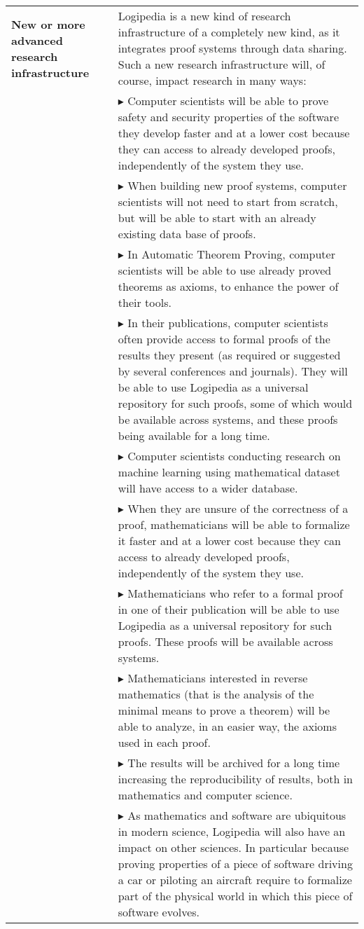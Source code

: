 \begin{longtable}{|p{}|p{}|}
\hline
{\bf New or more advanced research infrastructure}
&
Logipedia is a new kind of research
infrastructure of a completely new kind, as it integrates proof systems
through data sharing. Such a new research infrastructure will, of
course, impact research in many ways:\\
&
$\blacktriangleright$ Computer scientists
will be able to prove safety and security
  properties of the software they develop faster and at a lower cost
  because they can access to already developed proofs, independently
  of the system they use.
\\
&
$\blacktriangleright$ When building new proof systems, computer scientists will not
  need to start from scratch, but will be able to start with an already
  existing data base of proofs.
\\
&
$\blacktriangleright$ In Automatic Theorem Proving, computer scientists will be able
  to use already proved theorems as axioms, to enhance the power of
  their tools.
\\
&
$\blacktriangleright$ In their publications, computer scientists often provide access
  to formal proofs of the results they present (as required or
  suggested by several conferences and journals). They will be able to
  use Logipedia as a universal repository for such proofs, some of
  which would be available across systems, and these proofs being
  available for a long time.
\\
&
$\blacktriangleright$ Computer scientists conducting research on machine learning
  using mathematical dataset will have access to a wider database.
\\
&
$\blacktriangleright$ When they are unsure of the correctness of a proof,
  mathematicians will be able to formalize it faster and at a lower
  cost because they can access to already developed proofs,
  independently of the system they use.
\\
&
$\blacktriangleright$ Mathematicians who refer to a formal proof in one of
their
  publication will be able to use Logipedia as a universal
  repository for such proofs. These proofs will be available across
  systems.
\\
&
$\blacktriangleright$
Mathematicians interested in reverse mathematics (that is the analysis
of the minimal means to prove a theorem) will be able to analyze, in
an easier way, the axioms used in each proof.
\\
&
$\blacktriangleright$ The results will be archived for a long time increasing the
  reproducibility of results, both in mathematics and computer science.
\\
&
$\blacktriangleright$ As mathematics and software are ubiquitous in modern science,
  Logipedia will also have an impact on other sciences. In
  particular because proving properties of a piece of software driving
  a car or piloting an aircraft require to formalize part of the
  physical world in which this piece of software evolves.
\\


\end{longtable}
